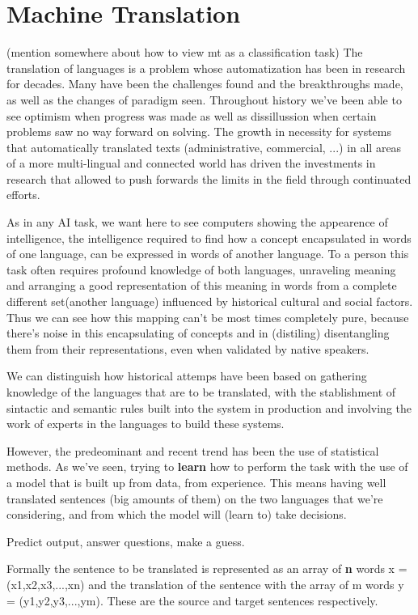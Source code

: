 \documentclass[11pt,english,listoffigures,listoftables]{tfgetsinf}
\begin{document}
\section{Machine Translation}
(mention somewhere about how to view mt as a classification task)
The translation of languages is a problem whose automatization has been in research for decades. Many have been the challenges found and the breakthroughs made, as well as the changes of paradigm seen.
Throughout history we've been able to see optimism when progress was made as well as dissillussion when certain problems saw no way forward on solving. 
The growth in necessity for systems that automatically translated texts (administrative, commercial, ...) in all areas of a more multi-lingual and connected world has driven the investments in research that allowed to push forwards the limits in the field through continuated efforts. 

As in any AI task, we want here to see computers showing the appearence of intelligence, the intelligence required to find how a concept encapsulated in words of one language, can be expressed in words of another language. To a person this task often requires profound knowledge of both languages, unraveling meaning and arranging a good representation of this meaning in words from a complete different set(another language) influenced by historical cultural and social factors.
Thus we can see how this mapping can't be most times completely pure, because there's noise in this encapsulating of concepts and in (distiling) disentangling them from their representations, even when validated by native speakers.

We can distinguish how historical attemps have been based on gathering knowledge of the languages that are to be translated, with the stablishment of sintactic and semantic rules built into the system in production and involving the work of experts in the languages to build these systems.

However, the predeominant and recent trend has been the use of statistical methods.  As we've seen, trying to \textbf{learn} how to perform the task with the use of a model that is built up from data, from experience. This means having well translated sentences (big amounts of them) on the two languages that we're considering, and from which the model will (learn to) take decisions.

Predict output, answer questions, make a guess.

Formally the sentence to be translated is represented as an array of \textbf{n} words x = (x1,x2,x3,...,xn) and the translation of the sentence with the array of m words y = (y1,y2,y3,...,ym). These are the source and target sentences respectively.
\end{document}
